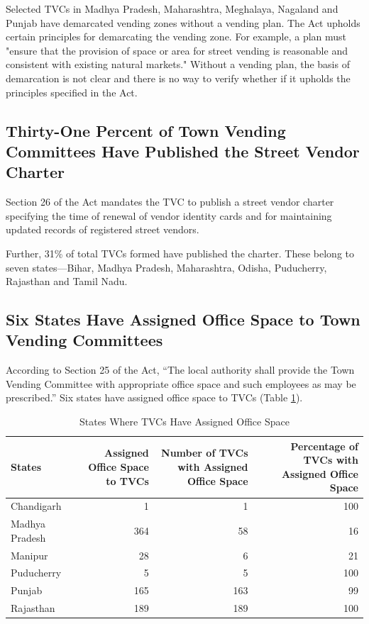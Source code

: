 \documentclass[a4paper, 12pt, twoside]{article}
\begin{document}
	Selected TVCs in Madhya Pradesh, Maharashtra, Meghalaya, Nagaland and Punjab have demarcated vending zones without a vending plan. The Act upholds certain principles for demarcating the vending zone. For example, a plan must "ensure that the provision of space or area for street vending is reasonable and consistent with existing natural markets." Without a vending plan, the basis of demarcation is not clear and there is no way to verify whether if it upholds the principles specified in the Act.

\subsection*{Thirty-One Percent of Town Vending Committees Have Published the Street Vendor Charter}
	Section 26 of the Act mandates the TVC to publish a street vendor charter specifying the time of renewal of vendor identity cards and for maintaining updated records of registered street vendors.

	Further, 31\% of total TVCs formed have published the charter. These belong to seven states—Bihar, Madhya Pradesh, Maharashtra, Odisha, Puducherry, Rajasthan and Tamil Nadu.

\subsection*{Six States Have Assigned Office Space to Town Vending Committees}
	According to Section 25 of the Act, “The local authority shall provide the Town Vending Committee with appropriate office space and such employees as may be prescribed.” Six states have assigned office space to TVCs (Table \ref{tab: OfficeSpace}).

\begin{table}[htpb]
\caption{States Where TVCs Have Assigned Office Space}
\label{tab: OfficeSpace}
\begin{tabular}{ l  r r r } %
\toprule
States & \multicolumn{1}{p{9em}}{Assigned Office Space to TVCs} & \multicolumn{1}{p{9em}}{Number of TVCs with Assigned Office Space} & \multicolumn{1}{p{9em}}{Percentage of TVCs with Assigned Office Space}\\
\midrule
Chandigarh & 1 & 1 & 100\\
Madhya Pradesh & 364 & 58 & 16\\
Manipur & 28 & 6 & 21\\
Puducherry & 5 & 5 & 100\\
Punjab & 165 & 163 & 99\\
Rajasthan & 189 & 189 & 100\\
\end{tabular}
\end{table}
\end{document}
